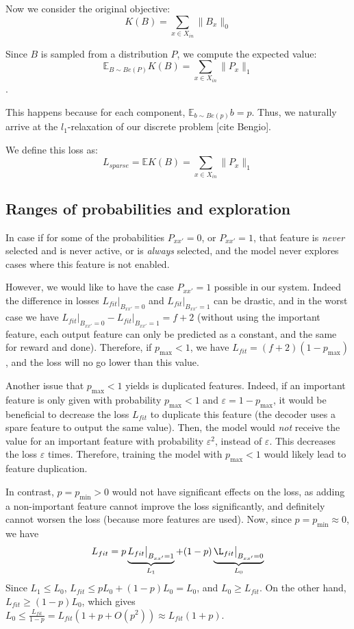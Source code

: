 \documentclass[a4paper,11pt,oneside]{report}
\begin{document}
Now we consider the original objective:
$$
K(B)=\sum\limits_{x\in X_{in}}\|B_x\|_0
$$

Since $B$ is sampled from a distribution $P$, we compute the expected value:
$$
\mathbb E_{B\sim Be(P)}K(B)=\sum\limits_{x\in X_{in}}\|P_x\|_1
$$.

This happens because for each component, $\mathbb E_{b\sim Be(p)}b=p$. Thus, we naturally arrive at the $l_1$-relaxation of our discrete problem [cite Bengio].

We define this loss as:
$$
L_{sparse}=\mathbb E K(B)=\sum\limits_{x\in X_{in}}\|P_x\|_1
$$

\subsection{Ranges of probabilities and exploration}
In case if for some of the probabilities $P_{xx'}=0$, or $P_{xx'}=1$, that feature is {\em never} selected and is never active, or is {\em always} selected, and the model never explores cases where this feature is not enabled.

However, we would like to have the case $P_{xx'}=1$ possible in our system. Indeed the difference in losses $L_{fit}\big|_{B_{xx'}=0}$ and $L_{fit}\big|_{B_{xx'}=1}$ can be drastic, and in the worst case we have $L_{fit}\big|_{B_{xx'}=0}-L_{fit}\big|_{B_{xx'}=1}=f+2$ (without using the important feature, each output feature can only be predicted as a constant, and the same for reward and done). Therefore, if $p_{\max}<1$, we have $L_{fit}=(f+2)(1-p_{\max})$, and the loss will no go lower than this value.

Another issue that $p_{\max}<1$ yields is duplicated features. Indeed, if an important feature is only given with probability $p_{\max}<1$ and $\varepsilon=1-p_{\max}$, it would be beneficial to decrease the loss $L_{fit}$ to duplicate this feature (the decoder uses a spare feature to output the same value). Then, the model would {\em not} receive the value for an important feature with probability $\varepsilon^2$, instead of $\varepsilon$. This decreases the loss $\varepsilon$ times. Therefore, training the model with $p_{\max}<1$ would likely lead to feature duplication.

In contrast, $p=p_{\min}>0$ would not have significant effects on the loss, as adding a non-important feature cannot improve the loss significantly, and definitely cannot worsen the loss (because more features are used). Now, since $p=p_{\min}\approx 0$, we have
$$
L_{fit}=p\underbrace{L_{fit}\big|_{B_{xx'}=1}}_{L_1}+(1-p)\underbrace{\L_{fit}\big|_{B_{xx'}=0}}_{L_0}
$$
Since $L_1\leq L_0$, $L_{fit}\leq pL_0+(1-p)L_0=L_0$, and $L_0\geq L_{fit}$. On the other hand, $L_{fit}\geq (1-p)L_0$, which gives $L_0\leq \frac{L_{fit}}{1-p}= L_{fit}(1+p+O(p^2))\approx L_{fit}(1+p)$.
\end{document}

